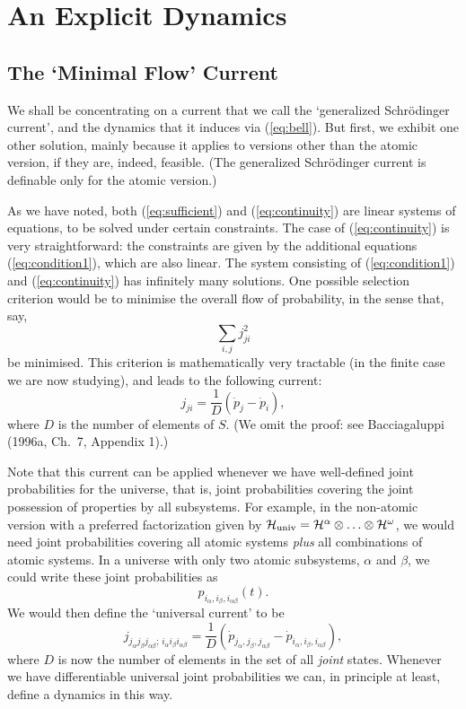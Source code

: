 \documentclass[12pt]{article}
\newcommand{\be}{\begin{equation}}
\newcommand{\ee}{\end{equation}}
\newcommand{\cH}{\cal{H}}                                       %
\newcommand{\ga}{\alpha}                                        %
\newcommand{\gb}{\beta}                                         %
\newcommand{\gab}{\alpha\beta}                                  %
\newcommand{\gw}{\omega}                                        %
\begin{document}
\section{An Explicit Dynamics}


\subsection{The `Minimal Flow' Current}


We shall be concentrating on a current that we call the `generalized 
Schr\"odinger current', and the dynamics that it induces via 
(\ref{eq:bell}).  But first, we exhibit one other solution, mainly 
because it applies to versions other than the atomic version, if they 
are, indeed, feasible.  (The generalized Schr\"odinger current is 
definable only for the atomic version.)

As we have noted, both (\ref{eq:sufficient}) and (\ref{eq:continuity}) 
are linear systems of equations, to be solved under certain 
constraints.  The case of (\ref{eq:continuity}) is very 
straightforward: the constraints are given by the additional equations 
(\ref{eq:condition1}), which are also linear.  The system consisting 
of (\ref{eq:condition1}) and (\ref{eq:continuity}) has infinitely many 
solutions.  One possible selection criterion would be to minimise the 
overall flow of probability, in the sense that, say,
\be
  \label{eq:minflow}
  \sum_{i,j} j^2_{ji}
\ee
be minimised.  This criterion is mathematically very tractable (in the 
finite case we are now studying), and leads to the following current:
\be
  \label{eq:generalsolution}
  j_{ji} = \frac{1}{D}(\dot{p}_j - \dot{p}_i),
\ee
where $D$ is the number of elements of $S$.  (We omit the proof: see 
Bacciagaluppi (1996a, Ch.~7, Appendix 1).)

Note that this current can be applied whenever we have well-defined 
joint probabilities for the universe, that is, joint probabilities 
covering the joint possession of properties by all subsystems.  For 
example, in the non-atomic version with a preferred factorization 
given by $\cH_{\mbox{\scriptsize univ}} = \cH^{\ga} \otimes
\ldots \otimes \cH^{\gw}$, we would need joint probabilities covering all
atomic systems {\it plus} all combinations of atomic systems.  In a 
universe with only two atomic subsystems, $\ga$ and $\gb$, we could 
write these joint probabilities as
\be
  \label{eq:nonatomic1}
  p_{i_{\ga},i_{\gb},i_{\gab}}(t).
\ee
We would then define the `universal current' to be
\be
  \label{eq:nonatomic2}
  j_{j_{\ga}j_{\gb}j_{\gab};\,i_{\ga}i_{\gb}i_{\gab}} =
  \frac{1}{D}(\dot{p}_{j_{\ga},j_{\gb},j_{\gab}} -
  \dot{p}_{i_{\ga},i_{\gb},i_{\gab}}),
\ee
where $D$ is now the number of elements in the set of all {\it joint} 
states.  Whenever we have differentiable universal joint probabilities 
we can, in principle at least, define a dynamics in this way.
\end{document}
